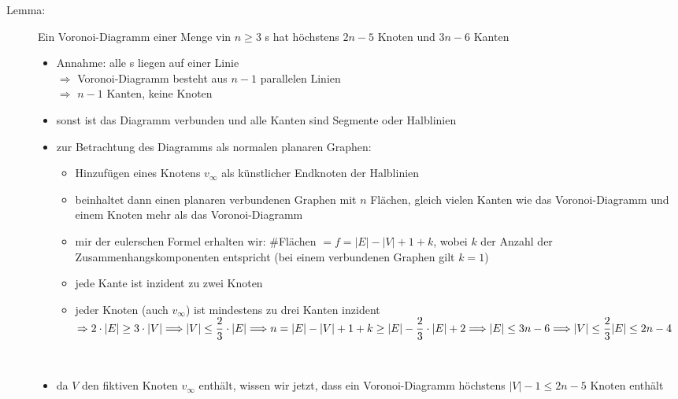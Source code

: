 \begin{description}
	\item[Lemma:] Ein Voronoi-Diagramm einer Menge vin $n\geq 3$ \site s hat höchstens $2n-5$ Knoten und $3n-6$ Kanten
	\up\Proof
	\up\begin{itemize}
		\item Annahme: alle \site s liegen auf einer Linie\\
			$\Rightarrow$ Voronoi-Diagramm besteht aus $n-1$ parallelen Linien\\
			$\Rightarrow$ $n-1$ Kanten, keine Knoten
		\item sonst ist das Diagramm verbunden und alle Kanten sind Segmente oder Halblinien
		\item zur Betrachtung des Diagramms als normalen planaren Graphen:
			\begin{itemize}
				\item Hinzufügen eines Knotens $v_{\infty}$ als künstlicher Endknoten der Halblinien
				\item beinhaltet dann einen planaren verbundenen Graphen mit $n$ Flächen, gleich vielen Kanten wie das Voronoi-Diagramm und einem Knoten mehr als das Voronoi-Diagramm
				\item mir der eulerschen Formel erhalten wir: $\#$Flächen $=f = |E|-|V|+1+k$, wobei $k$ der Anzahl der Zusammenhangskomponenten entspricht (bei einem verbundenen Graphen gilt $k=1$)
				\item jede Kante ist inzident zu zwei Knoten
				\item jeder Knoten (auch $v_{\infty}$) ist mindestens zu drei Kanten inzident\\
				$\Rightarrow 2\cdot |E| \geq 3\cdot |V| \Longrightarrow |V| \leq \dfrac{2}{3}\cdot |E| \Longrightarrow n = |E|-|V|+1+k \geq |E|-\dfrac{2}{3}\cdot |E|+2\\
				\Longrightarrow |E|\leq 3n -6 \Longrightarrow |V|\leq \dfrac{2}{3}|E| \leq 2n -4$
			\end{itemize}
	\end{itemize}
\end{description}
\topbreak
\up\up\up
\begin{description}
	\item[]\ \\\up
		\begin{itemize}
			\item da $V$ den fiktiven Knoten $v_{\infty}$ enthält, wissen wir jetzt, dass ein Voronoi-Diagramm höchstens $|V|-1 \leq 2n-5$ Knoten enthält
		\end{itemize}
\end{description}
